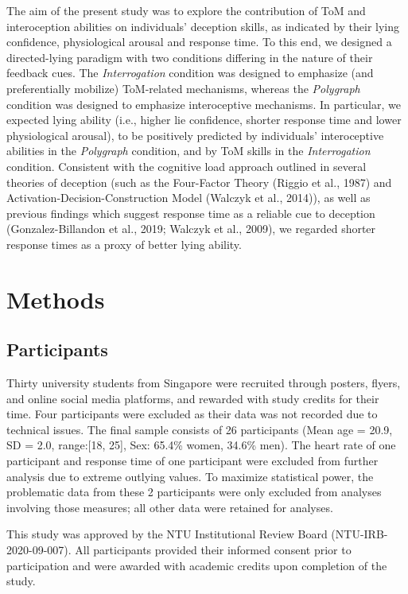\documentclass[
  man,mask,floatsintext]{apa6}
\begin{document}
The aim of the present study was to explore the contribution of ToM and interoception abilities on individuals' deception skills, as indicated by their lying confidence, physiological arousal and response time. To this end, we designed a directed-lying paradigm with two conditions differing in the nature of their feedback cues. The \emph{Interrogation} condition was designed to emphasize (and preferentially mobilize) ToM-related mechanisms, whereas the \emph{Polygraph} condition was designed to emphasize interoceptive mechanisms. In particular, we expected lying ability (i.e., higher lie confidence, shorter response time and lower physiological arousal), to be positively predicted by individuals' interoceptive abilities in the \emph{Polygraph} condition, and by ToM skills in the \emph{Interrogation} condition. Consistent with the cognitive load approach outlined in several theories of deception (such as the Four-Factor Theory (Riggio et al., 1987) and Activation-Decision-Construction Model (Walczyk et al., 2014)), as well as previous findings which suggest response time as a reliable cue to deception (Gonzalez-Billandon et al., 2019; Walczyk et al., 2009), we regarded shorter response times as a proxy of better lying ability.

\hypertarget{methods}{%
\section{Methods}\label{methods}}

\hypertarget{participants}{%
\subsection{Participants}\label{participants}}

Thirty university students from Singapore were recruited through posters, flyers, and online social media platforms, and rewarded with study credits for their time.
Four participants were excluded as their data was not recorded due to technical issues. The final sample consists of 26 participants (Mean age = 20.9, SD = 2.0, range:{[}18, 25{]}, Sex: 65.4\% women, 34.6\% men). The heart rate of one participant and response time of one participant were excluded from further analysis due to extreme outlying values. To maximize statistical power, the problematic data from these 2 participants were only excluded from analyses involving those measures; all other data were retained for analyses.

This study was approved by the NTU Institutional Review Board (NTU-IRB-2020-09-007). All participants provided their informed consent prior to participation and were awarded with academic credits upon completion of the study.
\end{document}
